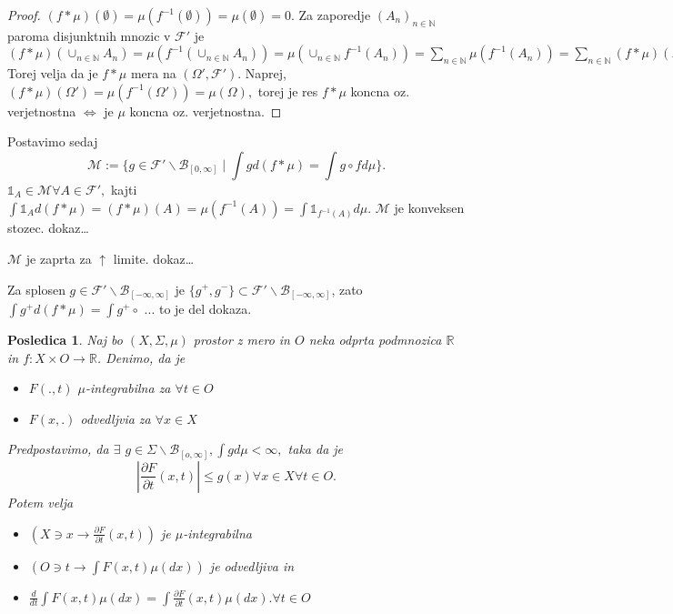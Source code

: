 \documentclass[a4paper,12pt]{article}
\theoremstyle{definition} %
\theoremstyle{plain} %
\newtheorem{posledica}[definicija]{Posledica}
\newcommand{\R}{\mathbb{R}}
\newcommand{\N}{\mathbb{N}}
\newcommand{\F}{\mathcal{F}}
\begin{document}
            \begin{proof}
                $(f*\mu)(\emptyset) = \mu(f^{-1}(\emptyset)) = \mu(\emptyset) = 0.$
                Za zaporedje $(A_n)_{n \in \N}$ paroma disjunktnih mnozic v $\F'$ je 
                $(f*\mu)(\cup_{n\in\N}A_n) = \mu(f^{-1}(\cup_{n \in \N}A_n)) = \mu(\cup_{n\in\N}f^{-1}(A_n)) = \sum_{n\in\N}\mu(f^{-1}(A_n)) = \sum_{n\in\N}(f*\mu)(A_n).$	
                Torej velja da je $f*\mu$ mera na $(\Omega', \F')$.
                Naprej, $(f*\mu)(\Omega') = \mu(f^{-1}(\Omega')) = \mu(\Omega),$ torej je res $f*\mu$ koncna oz. verjetnostna
                $\iff$ je $\mu$ koncna oz. verjetnostna.
            \end{proof}

            Postavimo sedaj
            $$
            \mathcal{M} := \{g \in \F'\backslash\mathcal{B}_{[0, \infty]} \mid \int gd(f* \mu) = \int g \circ f d\mu\}.
            $$
            $\mathds{1}_A \in \mathcal{M} \forall A \in \F',$ kajti $\int \mathds{1}_Ad(f*\mu) = (f*\mu)(A) = \mu(f^{-1}(A)) = \int\mathds{1}_{f^{-1}(A)}d\mu$.
            $\mathcal{M}$ je konveksen stozec.
            dokaz\dots

            $\mathcal{M}$ je zaprta za $\uparrow$ limite.
            dokaz\dots

            Za splosen $g \in \F'\backslash\mathcal{B}_{[-\infty, \infty]}$ je $\{g^+, g^-\} \subset \F'\backslash\mathcal{B}_{[-\infty, \infty]}$,
            zato $\int g^+d(f* \mu) = \int g^+ \circ $ ... to je del dokaza.

            \begin{posledica}
                Naj bo $(X, \Sigma, \mu)$ prostor z mero in $O$ neka odprta podmnozica $\R$ in $f:X \times O \rightarrow \R$. Denimo, da je 
                \begin{itemize}
                    \item $F(., t)$ $\mu$-integrabilna za $\forall t \in O$
                    \item $F(x, .)$ odvedljvia za $\forall x \in X$ 
                \end{itemize}
                Predpostavimo, da $\exists$ $g \in \Sigma\backslash\mathcal{B}_{[o, \infty]}, \int g d\mu < \infty,$ taka da je 
                $$
                    \left|\frac{\partial F}{\partial t}(x, t) \right| \leq g(x) \forall x \in X \forall t \in O.
                $$
                Potem velja 
                \begin{itemize}
                    \item $(X \ni x \rightarrow \frac{\partial F}{\partial t}(x, t))$ je $\mu$-integrabilna
                    \item $(O \ni t \rightarrow \int F(x,t)\mu(dx))$ je odvedljiva in 
                    \item $\frac{d}{dt}\int F(x, t)\mu(dx) = \int \frac{\partial F}{\partial t}(x, t)\mu(dx). \forall t \in O$
                \end{itemize}
            \end{posledica}
\end{document}
